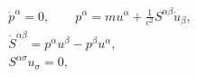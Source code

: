 \begin{equation}
     \begin{array}{ll}
     \dot{p}^\alpha=0,\qquad
     p^\alpha=mu^\alpha+
     \displaystyle\frac{1}{c^2}S^{\alpha\beta}\dot{u}_{\beta},
     \\[8pt]
     \dot{S}^{\alpha\beta}=p^\alpha u^{\beta}-p^\beta u^{\alpha},
     \\[6pt]
     S^{\alpha\sigma}u_{\sigma}=0,
     \end{array}
     \label{WeRaeq}
\end{equation}

